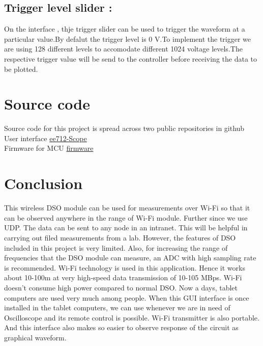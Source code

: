 \documentclass{article}
\begin{document}
	\subsection{Trigger level slider :}
	On the interface , thje trigger slider can be used to trigger the waveform at a particular value.By defalut the trigger level is 0 V.To implement the trigger we are using 128 different levels to accomodate different 1024 voltage levels.The respective trigger value will be send to the controller before receiving the data to be plotted.
	\section{Source code}
	Source code for this project is spread across two public repositories in github\\
	User interface \href{https://github.com/aswinpajayan/ScopeUI.git}{ee712-Scope}\\
	Firmware for MCU \href{https://github.com/aswinpajayan/wifi-DSO-module.git}{firmware}
	
	\section{Conclusion}
	This wireless DSO module can be used for  measurements
	over Wi-Fi so that it can be observed anywhere in the range of Wi-Fi module. Further since we use UDP. The data can be sent to any node in an intranet. This will be helpful in carrying out filed measurements from a lab. 
	However, the features of DSO included in this project is very limited. Also, for
	increasing the range of frequencies that the DSO module can measure, an ADC with
	high sampling rate is recommended.
	Wi-Fi technology is used in this application. Hence it works about 10-100m at very
	high-speed data transmission of 10-105 MBps. Wi-Fi doesn’t consume high power
	compared to normal DSO. Now a days, tablet computers are used very much among
	people. When this GUI interface is once installed in the tablet computers, we can use
	whenever we are in need of Oscilloscope and its remote control is possible. Wi-Fi
	transmitter is also portable. And this interface also makes so easier to observe
	response of the circuit as graphical waveform.
\end{document}
